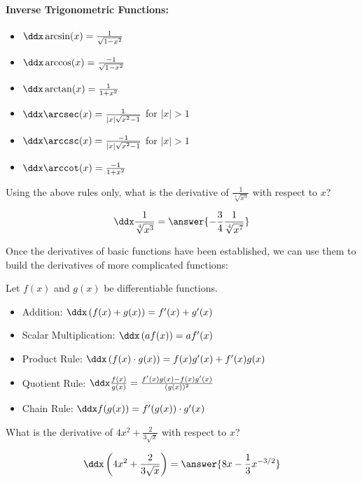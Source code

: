 \documentclass[nooutcomes]{ximera}
\begin{document}
\paragraph{Inverse Trigonometric Functions:}
\begin{itemize}
\item $\ddx \arcsin(x) = \frac{1}{\sqrt{1-x^2}}$
\item $\ddx \arccos(x) = \frac{-1}{\sqrt{1-x^2}}$
\item $\ddx \arctan(x) =\frac{1}{1+x^2}$
\item $\ddx \arcsec(x) = \frac{1}{|x|\sqrt{x^2-1}}$ for $|x|>1$
\item $\ddx \arccsc(x) = \frac{-1}{|x|\sqrt{x^2-1}}$ for $|x|>1$
\item $\ddx \arccot(x) = \frac{-1}{1+x^2}$
\end{itemize}



\begin{question} 
  Using the above rules only, what is the derivative of $\frac{1}{\sqrt[4]{x^3}}$ with respect to $x$?
  \begin{prompt} 
    \[
    \ddx \frac{1}{\sqrt[4]{x^3}} = \answer{- \frac{3}{4} \frac{1}{\sqrt[4]{x^7}}}
    \]
  \end{prompt}
\end{question}


Once the derivatives of basic functions have been established, we can use them to build the derivatives of more complicated functions:


\begin{theorem}
  Let $f(x)$ and $g(x)$ be differentiable functions.
\begin{itemize}
\item Addition: $\ddx \left( f(x) + g(x) \right) = f'(x) + g'(x)$
\item Scalar Multiplication: $\ddx \left( af(x) \right) = a f'(x)$
\item Product Rule: $\ddx \left( f(x) \cdot g(x) \right) = f(x)g'(x) + f'(x)g(x)$
\item Quotient Rule: $\ddx \frac{f(x)}{g(x)} = \frac{f'(x)g(x) - f(x)g'(x)}{(g(x))^2}$
\item Chain Rule: $\ddx f(g(x)) = f'(g(x)) \cdot g'(x)$
\end{itemize}
\end{theorem}

\begin{question} 
  What is the derivative of $4x^2 +\frac{2}{3\sqrt{x}} $ with respect to $x$?
  \begin{prompt} 
    \[
    \ddx \left(4x^2 +\frac{2}{3\sqrt{x}} \right) = \answer{8x -\frac{1}{3} x^{-3/2}}
    \]
  \end{prompt}
\end{question}
\end{document}
